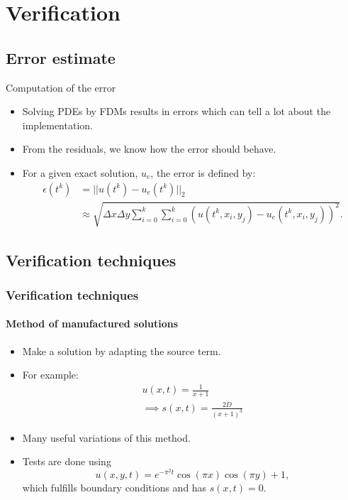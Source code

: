 \documentclass[12pt,a4paper, xcolor={usenames,dvipsnames,svgnames,table}]{beamer}
\begin{document}
\section{Verification}
\subsection{Error estimate}
\begin{frame}{Computation of the error}
\begin{itemize}
 \item<1-> Solving PDEs by FDMs results in errors which can tell a lot about the implementation.
 \item<2-> From the residuals, we know how the error should behave.
 \item<3-> For a given exact solution, $u_e$, the error is defined by:
 \begin{align*}
  \epsilon(t^k) &= ||u(t^k)-u_e(t^k)||_2 \\
   &\approx \sqrt{\Delta x\Delta y\sum\limits_{i=0}^k\sum\limits_{i=0}^k \left(u(t^k,x_i,y_j)-u_e(t^k,x_i,y_j)\right)^2}.
 \end{align*}

\end{itemize}
\end{frame}
\notetoself{}


\subsection{Verification techniques}

\begin{frame}[shrink]
\frametitle{Verification techniques}
\framesubtitle{Method of manufactured solutions}
\begin{itemize}
 \item<1-> Make a solution by adapting the source term.
 \item<2-> For example:
 \begin{align*}
  u(x,t) = \frac{1}{x+1}\\
  \implies s(x,t) = \frac{2D}{(x+1)^3}
 \end{align*}
 \item<3-> Many useful variations of this method.
 \item<4-> Tests are done using 
  \begin{equation*}
  u(x,y,t) = e^{-\pi^2t}\cos(\pi x)\cos(\pi y) +1,
 \end{equation*}
 which fulfills boundary conditions and has $s(x,t) = 0$.
\end{itemize}
\end{frame}
\notetoself{}
\end{document}
